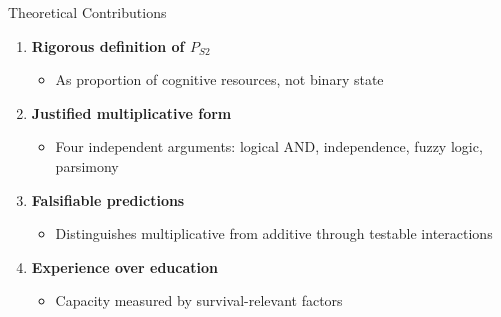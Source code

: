 \documentclass[aspectratio=169]{beamer}
\begin{document}
\begin{frame}{Theoretical Contributions}

\begin{enumerate}
    \item \textbf{Rigorous definition of $P_{S2}$}
    \begin{itemize}
        \item As proportion of cognitive resources, not binary state
    \end{itemize}
    
    \item \textbf{Justified multiplicative form}
    \begin{itemize}
        \item Four independent arguments: logical AND, independence, fuzzy logic, parsimony
    \end{itemize}
    
    \item \textbf{Falsifiable predictions}  
    \begin{itemize}
        \item Distinguishes multiplicative from additive through testable interactions
    \end{itemize}
    
    \item \textbf{Experience over education}
    \begin{itemize}
        \item Capacity measured by survival-relevant factors
    \end{itemize}
\end{enumerate}

\end{frame}
\end{document}
